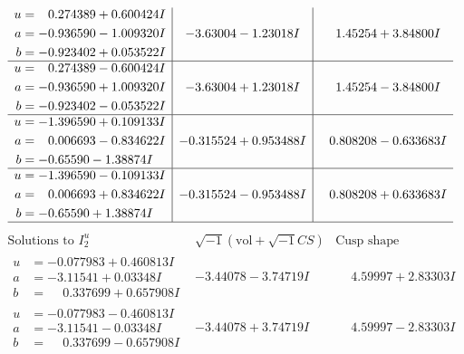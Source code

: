 \documentclass[1p]{elsarticle_modified}
\theoremstyle{definition}
\newcommand{\I}{\sqrt{-1}}
\begin{document}
$$\begin{array}{c|c|c}
\begin{aligned}
u &= \phantom{-}0.274389 + 0.600424 I \\
a &= -0.936590 - 1.009320 I \\
b &= -0.923402 + 0.053522 I\end{aligned}
 & -3.63004 - 1.23018 I & \phantom{-}1.45254 + 3.84800 I \\ \hline\begin{aligned}
u &= \phantom{-}0.274389 - 0.600424 I \\
a &= -0.936590 + 1.009320 I \\
b &= -0.923402 - 0.053522 I\end{aligned}
 & -3.63004 + 1.23018 I & \phantom{-}1.45254 - 3.84800 I \\ \hline\begin{aligned}
u &= -1.396590 + 0.109133 I \\
a &= \phantom{-}0.006693 - 0.834622 I \\
b &= -0.65590 - 1.38874 I\end{aligned}
 & -0.315524 + 0.953488 I & \phantom{-}0.808208 - 0.633683 I \\ \hline\begin{aligned}
u &= -1.396590 - 0.109133 I \\
a &= \phantom{-}0.006693 + 0.834622 I \\
b &= -0.65590 + 1.38874 I\end{aligned}
 & -0.315524 - 0.953488 I & \phantom{-}0.808208 + 0.633683 I\\
 \hline 
 \end{array}$$\newpage$$\begin{array}{c|c|c}  
\text{Solutions to }I^u_{2}& \I (\text{vol} + \sqrt{-1}CS) & \text{Cusp shape}\\
 \hline 
\begin{aligned}
u &= -0.077983 + 0.460813 I \\
a &= -3.11541 + 0.03348 I \\
b &= \phantom{-}0.337699 + 0.657908 I\end{aligned}
 & -3.44078 - 3.74719 I & \phantom{-}4.59997 + 2.83303 I \\ \hline\begin{aligned}
u &= -0.077983 - 0.460813 I \\
a &= -3.11541 - 0.03348 I \\
b &= \phantom{-}0.337699 - 0.657908 I\end{aligned}
 & -3.44078 + 3.74719 I & \phantom{-}4.59997 - 2.83303 I \\ \hline\begin{aligned}

\end{aligned}
\end{array}$$
\end{document}
